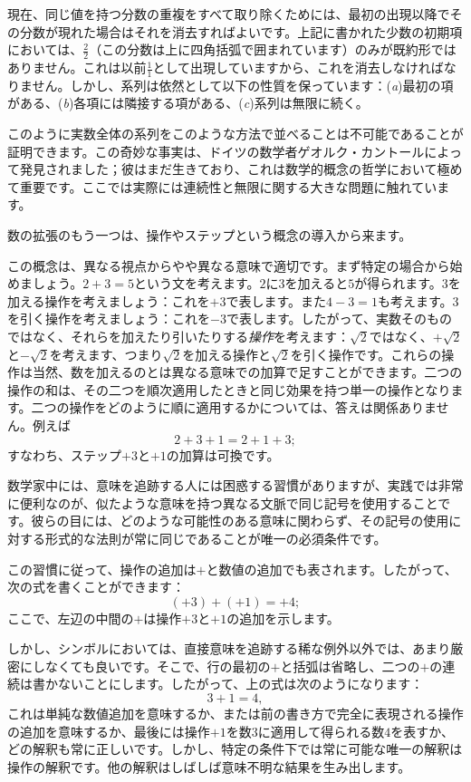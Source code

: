 \documentclass[a4paper,11pt,openany]{ltjsbook}
\begin{document}
現在、同じ値を持つ分数の重複をすべて取り除くためには、最初の出現以降でその分数が現れた場合はそれを消去すればよいです。上記に書かれた少数の初期項においては、$\frac{2}{2}$（この分数は上に四角括弧で囲まれています）のみが既約形ではありません。これは以前$\frac{1}{1}$として出現していますから、これを消去しなければなりません。しかし、系列は依然として以下の性質を保っています：(\textit{a})最初の項がある、(\textit{b})各項には隣接する項がある、(\textit{c})系列は無限に続く。

このように実数全体の系列をこのような方法で並べることは不可能であることが証明できます。この奇妙な事実は、ドイツの数学者ゲオルク・カントールによって発見されました；彼はまだ生きており、これは数学的概念の哲学において極めて重要です。ここでは実際には連続性と無限に関する大きな問題に触れています。

数の拡張のもう一つは、操作やステップという概念の導入から来ます。

この概念は、異なる視点からやや異なる意味で適切です。まず特定の場合から始めましょう。$2 + 3 = 5$という文を考えます。$2$に$3$を加えると$5$が得られます。$3$を加える操作を考えましょう：これを$+3$で表します。また$4 - 3 = 1$も考えます。$3$を引く操作を考えましょう：これを$-3$で表します。したがって、実数そのものではなく、それらを加えたり引いたりする\emph{操作}を考えます：$\sqrt{2}$ではなく、$+\sqrt{2}$と$-\sqrt{2}$を考えます、つまり$\sqrt{2}$を加える操作と$\sqrt{2}$を引く操作です。これらの操作は当然、数を加えるのとは異なる意味での加算で足すことができます。二つの操作の和は、その二つを順次適用したときと同じ効果を持つ単一の操作となります。二つの操作をどのように順に適用するかについては、答えは関係ありません。例えば
\[
2 + 3 + 1 = 2 + 1 + 3;
\]
すなわち、ステップ$+3$と$+1$の加算は可換です。

数学家中には、意味を追跡する人には困惑する習慣がありますが、実践では非常に便利なのが、似たような意味を持つ異なる文脈で同じ記号を使用することです。彼らの目には、どのような可能性のある意味に関わらず、その記号の使用に対する形式的な法則が常に同じであることが唯一の必須条件です。

この習慣に従って、操作の追加は$+$と数値の追加でも表されます。したがって、次の式を書くことができます：
\[
(+3) + (+1) = +4;
\]
ここで、左辺の中間の$+$は操作$+3$と$+1$の追加を示します。

しかし、シンボルにおいては、直接意味を追跡する稀な例外以外では、あまり厳密にしなくても良いです。そこで、行の最初の$+$と括弧は省略し、二つの$+$の連続は書かないことにします。したがって、上の式は次のようになります：
\[
3 + 1 = 4,
\]
これは単純な数値追加を意味するか、または前の書き方で完全に表現される操作の追加を意味するか、最後には操作$+1$を数$3$に適用して得られる数$4$を表すか、どの解釈も常に正しいです。しかし、特定の条件下では常に可能な唯一の解釈は操作の解釈です。他の解釈はしばしば意味不明な結果を生み出します。
\end{document}
